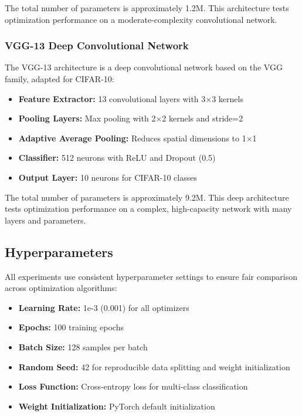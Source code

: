 \documentclass[12pt]{article}
\begin{document}
The total number of parameters is approximately 1.2M. This architecture tests optimization performance on a moderate-complexity convolutional network.

\subsubsection{VGG-13 Deep Convolutional Network}

The VGG-13 architecture is a deep convolutional network based on the VGG family, adapted for CIFAR-10:

\begin{itemize}
    \item \textbf{Feature Extractor:} 13 convolutional layers with 3×3 kernels
    \item \textbf{Pooling Layers:} Max pooling with 2×2 kernels and stride=2
    \item \textbf{Adaptive Average Pooling:} Reduces spatial dimensions to 1×1
    \item \textbf{Classifier:} 512 neurons with ReLU and Dropout (0.5)
    \item \textbf{Output Layer:} 10 neurons for CIFAR-10 classes
\end{itemize}

The total number of parameters is approximately 9.2M. This deep architecture tests optimization performance on a complex, high-capacity network with many layers and parameters.

\subsection{Hyperparameters}

All experiments use consistent hyperparameter settings to ensure fair comparison across optimization algorithms:

\begin{itemize}
    \item \textbf{Learning Rate:} 1e-3 (0.001) for all optimizers
    \item \textbf{Epochs:} 100 training epochs
    \item \textbf{Batch Size:} 128 samples per batch
    \item \textbf{Random Seed:} 42 for reproducible data splitting and weight initialization
    \item \textbf{Loss Function:} Cross-entropy loss for multi-class classification
    \item \textbf{Weight Initialization:} PyTorch default initialization
\end{itemize}
\end{document}
